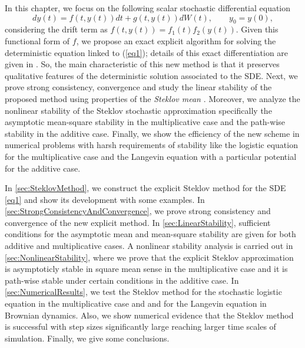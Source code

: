 	In this chapter, we focus on the following scalar stochastic differential equation
\begin{equation}\label{eq1}
	dy(t)=f(t,y(t))dt+g(t,y(t))dW(t), \qquad y_0=y(0),
\end{equation}
considering the drift term as $f(t,y(t))=f_1(t)f_2(y(t))$. Given this functional 
form of $f$, we propose an exact
explicit algorithm for solving the  deterministic equation linked to (\ref{eq1});
details of this exact differentiation are given in \cite{Matus2005}. So, the main
characteristic of this new method is that it preserves qualitative features of the
deterministic solution associated  to the SDE. Next, we prove strong consistency,
convergence and study the linear stability of the proposed method using properties
of the {\it Steklov mean} \cite{Timan1963}.  Moreover,  we analyze the nonlinear
stability of the Steklov stochastic approximation  specifically the asymptotic
mean-square stability in the multiplicative case and the  path-wise stability in the
additive case. Finally, we show  the efficiency of the new  scheme in numerical
problems with harsh requirements of  stability like the logistic  equation for the
multiplicative case and the Langevin  equation with a particular potential  for the
additive case.

	In \cref{sec:SteklovMethod}, we construct the explicit
Steklov method  for the SDE \eqref{eq1} and show its development  with some examples.
In \cref{sec:StrongConsistencyAndConvergence}, we prove strong consistency and convergence of the new explicit
method. In \cref{sec:LinearStability}, sufficient conditions for the asymptotic mean and
mean-square  stability are given for both additive and multiplicative cases. A
nonlinear  stability  analysis is carried out in \cref{sec:NonlinearStability}, where we prove
that the  explicit Steklov  approximation is asymptoticly stable in square mean sense
in the  multiplicative case and  it is path-wise stable under certain conditions in
the additive  case. In \cref{sec:NumericalResults},  we test the Steklov method for
the stochastic  logistic equation in the  multiplicative case and and for the Langevin
equation in  Brownian dynamics. Also, we show  numerical evidence that the Steklov
method  is successful  with step sizes significantly  large reaching larger time
scales of simulation. Finally,  we give some conclusions.